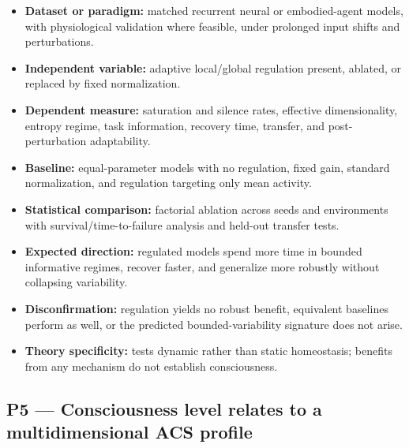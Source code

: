 \documentclass[
  11pt,
  a4paper,
]{article}
\providecommand{\tightlist}{%
  \setlength{\itemsep}{0pt}\setlength{\parskip}{0pt}}
\begin{document}
\begin{itemize}
\tightlist
\item
  \textbf{Dataset or paradigm:} matched recurrent neural or
  embodied-agent models, with physiological validation where feasible,
  under prolonged input shifts and perturbations.
\item
  \textbf{Independent variable:} adaptive local/global regulation
  present, ablated, or replaced by fixed normalization.
\item
  \textbf{Dependent measure:} saturation and silence rates, effective
  dimensionality, entropy regime, task information, recovery time,
  transfer, and post-perturbation adaptability.
\item
  \textbf{Baseline:} equal-parameter models with no regulation, fixed
  gain, standard normalization, and regulation targeting only mean
  activity.
\item
  \textbf{Statistical comparison:} factorial ablation across seeds and
  environments with survival/time-to-failure analysis and held-out
  transfer tests.
\item
  \textbf{Expected direction:} regulated models spend more time in
  bounded informative regimes, recover faster, and generalize more
  robustly without collapsing variability.
\item
  \textbf{Disconfirmation:} regulation yields no robust benefit,
  equivalent baselines perform as well, or the predicted
  bounded-variability signature does not arise.
\item
  \textbf{Theory specificity:} tests dynamic rather than static
  homeostasis; benefits from any mechanism do not establish
  consciousness.
\end{itemize}

\subsection{P5 --- Consciousness level relates to a multidimensional ACS
profile}\label{p5-consciousness-level-relates-to-a-multidimensional-acs-profile}
\end{document}
